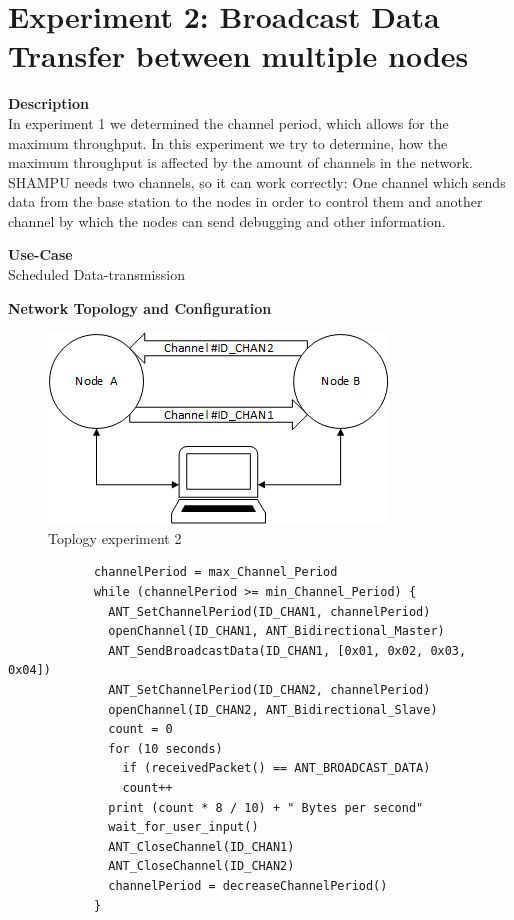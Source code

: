\section{Experiment 2: Broadcast Data Transfer between multiple nodes}
\begin{description} 
	\item{\textbf{Description}} \hfill \\ In experiment 1 we determined the channel period, which allows for the maximum throughput. In this experiment we try to determine, how the maximum throughput is affected by the amount of channels in the network. SHAMPU needs two channels, so it can work correctly: One channel which sends data from the base station to the nodes in order to control them and another channel by which the nodes can send debugging and other information.
	\item{\textbf{Use-Case}} \hfill \\ Scheduled Data-transmission	
	\item{\textbf{Network Topology and Configuration}} \hfill
		\begin{figure}[H]
			\centering
			\includegraphics[scale=1]{./pics/exp2_topo.png}
			\caption{Toplogy experiment 2}
		\end{figure}
		\begin{code}[H]
			\begin{verbatim}
			channelPeriod = max_Channel_Period
			while (channelPeriod >= min_Channel_Period) {
			  ANT_SetChannelPeriod(ID_CHAN1, channelPeriod)
			  openChannel(ID_CHAN1, ANT_Bidirectional_Master)
			  ANT_SendBroadcastData(ID_CHAN1, [0x01, 0x02, 0x03, 0x04])
			  ANT_SetChannelPeriod(ID_CHAN2, channelPeriod)
			  openChannel(ID_CHAN2, ANT_Bidirectional_Slave)
			  count = 0
			  for (10 seconds) 
			    if (receivedPacket() == ANT_BROADCAST_DATA)
			    count++			
			  print (count * 8 / 10) + " Bytes per second"
			  wait_for_user_input()
			  ANT_CloseChannel(ID_CHAN1)
			  ANT_CloseChannel(ID_CHAN2)
			  channelPeriod = decreaseChannelPeriod()
			}
			\end{verbatim}
			\caption{Broadcast data transfer two channels (Master)}\label{lst:mExp2}
		\end{code}
		

\end{description}
